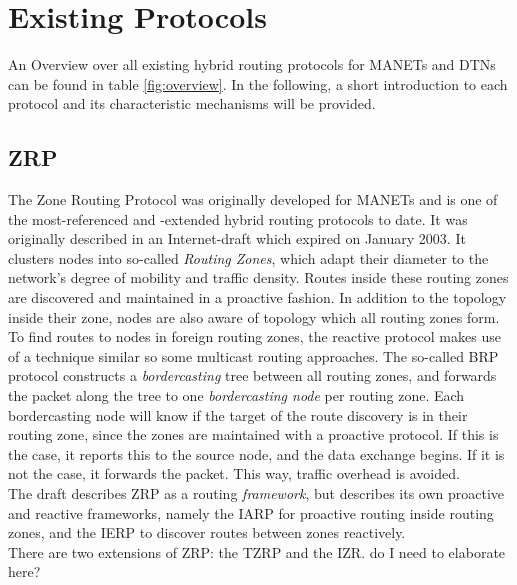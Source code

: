 \documentclass[a4paper,10pt]{scrartcl}
\begin{document}

\section{Existing Protocols}
\label{sec:existing_protocols}
An Overview over all existing hybrid routing protocols for \glspl{MANET} and \glspl{DTN}
can be found in table \ref{fig:overview}. In the following, a short introduction to each protocol and its characteristic mechanisms will be provided.

\subsection{\gls{ZRP}}
\label{subsec:zrp}
The Zone Routing Protocol was originally developed for \glspl{MANET} and is one of the most-referenced and -extended hybrid routing protocols to date. It was originally described in an Internet-draft which expired on January 2003\cite{ZRP-Draft}.
It clusters nodes into so-called \emph{Routing Zones}, which adapt their diameter to the network's degree of mobility and traffic density. Routes inside these routing zones are discovered and maintained in a proactive fashion. In addition to the topology inside their zone, nodes are also aware of topology which all routing zones form.
To find routes to nodes in foreign routing zones, the reactive protocol makes use of a technique similar so some multicast routing approaches. The so-called \gls{BRP}\cite{draft-ietf-manet-zone-brp} protocol constructs a \emph{bordercasting} tree between all routing zones, and forwards the packet along the tree to one \emph{bordercasting node} per routing zone. Each bordercasting node will know if the target of the route discovery is in their routing zone, since the zones are maintained with a proactive protocol. If this is the case, it reports this to the source node, and the data exchange begins. If it is not the case, it forwards the packet. This way, traffic overhead is avoided.\\
The draft describes ZRP as a routing \emph{framework}, but describes its own proactive and reactive frameworks, namely the \gls{IARP}\cite{draft-ietf-manet-zone-iarp} for proactive routing inside routing zones, and the \gls{IERP}\cite{draft-ietf-manet-zone-ierp} to discover routes between zones reactively.\\
There are two extensions of ZRP: the \gls{TZRP}\cite{TZRP} and the \gls{IZR}\cite{IZR}. \todo
{do I need to elaborate here?}
\end{document}
